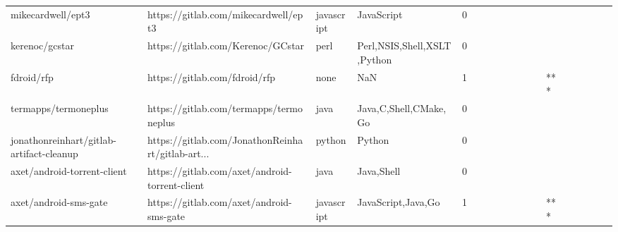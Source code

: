 \begin{tabular}{llllrlllllllllllll}
mikecardwell/ept3                                  &               https://gitlab.com/mikecardwell/ept3 &        javascript &                                         JavaScript &       0 &         &        &           &                &                 &        &           &           &          &          &       &              &          \\
kerenoc/gcstar                                     &                  https://gitlab.com/Kerenoc/GCstar &              perl &                        Perl,NSIS,Shell,XSLT,Python &       0 &         &        &           &                &                 &        &           &           &          &          &       &              &          \\
fdroid/rfp                                         &                      https://gitlab.com/fdroid/rfp &              none &                                                NaN &       1 &         &        &           &                &                 &        &           &       *** &          &          &       &              &          \\
termapps/termoneplus                               &            https://gitlab.com/termapps/termoneplus &              java &                              Java,C,Shell,CMake,Go &       0 &         &        &           &                &                 &        &           &           &          &          &       &              &          \\
jonathonreinhart/gitlab-artifact-cleanup           &  https://gitlab.com/JonathonReinhart/gitlab-art... &            python &                                             Python &       0 &         &        &           &                &                 &        &           &           &          &          &       &              &          \\
axet/android-torrent-client                        &     https://gitlab.com/axet/android-torrent-client &              java &                                         Java,Shell &       0 &         &        &           &                &                 &        &           &           &          &          &       &              &          \\
axet/android-sms-gate                              &           https://gitlab.com/axet/android-sms-gate &        javascript &                                 JavaScript,Java,Go &       1 &         &        &           &                &                 &        &           &       *** &          &          &       &              &          \\

\end{tabular}
